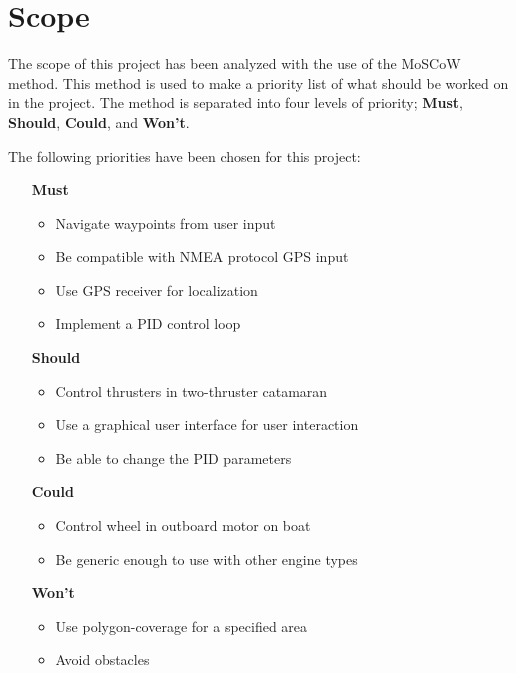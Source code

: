 
\chapter{Scope}
The scope of this project has been analyzed with the use of the MoSCoW method\cite{moscow}. This method is used to make a priority list of what should be worked on in the project. The method is separated into four levels of priority; \textbf{Must}, \textbf{Should}, \textbf{Could}, and \textbf{Won't}.

\noindent The following priorities have been chosen for this project:
\begin{itemize}
	\item[\textbf{Must}]
		\begin{itemize}
			\item Navigate waypoints from user input
			\item Be compatible with NMEA protocol GPS input
			\item Use GPS receiver for localization
			\item Implement a PID control loop
		\end{itemize}
	\item[\textbf{Should}]
		\begin{itemize}
			\item Control thrusters in two-thruster catamaran
			\item Use a graphical user interface for user interaction
			\item Be able to change the PID parameters
		\end{itemize}
	\item[\textbf{Could}] 
		\begin{itemize}
			\item Control wheel in outboard motor on boat
			\item Be generic enough to use with other engine types
		\end{itemize}
	\item[\textbf{Won't}]
		\begin{itemize}
			\item Use polygon-coverage for a specified area
			\item Avoid obstacles
		\end{itemize}
\end{itemize}